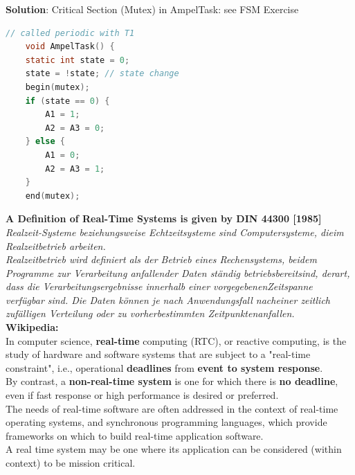 \newpage
\textbf{Solution}: Critical Section (Mutex) in AmpelTask:  see FSM Exercise\\

\begin{lstlisting}[style=mystyle, language=c]
 	// called periodic with T1  
	void AmpelTask() {
	static int state = 0;
	state = !state; // state change
  	begin(mutex);
	if (state == 0) {
		A1 = 1;
		A2 = A3 = 0;
	} else {
		A1 = 0;
		A2 = A3 = 1;
	}
  	end(mutex);
\end{lstlisting}

\newpage

{\rot\bf A Definition of Real-Time Systems is given by DIN 44300 [1985]}\\

\textit{ Realzeit-Systeme beziehungsweise Echtzeitsysteme sind Computersysteme, dieim Realzeitbetrieb arbeiten.}\\

\textit{Realzeitbetrieb wird definiert als der Betrieb eines Rechensystems, beidem Programme zur Verarbeitung anfallender Daten st\"{a}ndig betriebsbereitsind, derart, dass die Verarbeitungsergebnisse innerhalb einer vorgegebenenZeitspanne verf\"{u}gbar sind. Die Daten k\"{o}nnen je nach Anwendungsfall nacheiner zeitlich zuf\"{a}lligen Verteilung oder zu vorherbestimmten Zeitpunktenanfallen.}\\

{\rot\bf Wikipedia:}\\

In computer science, \textbf{real-time} computing (RTC), or reactive computing, is the study of hardware and software systems that are subject to a "real-time constraint", i.e., operational \textbf{deadlines} from \textbf{event to system response}. \\

By contrast, a \textbf{non-real-time system}  is one for which there is \textbf{no deadline}, even if fast response or high performance is desired or preferred. \\

The needs of real-time software are often addressed in the context of real-time operating systems, and synchronous programming languages, which provide frameworks on which to build real-time application software.\\

A real time system may be one where its application can be considered (within context) to be mission critical. \\

